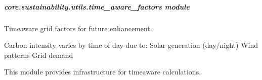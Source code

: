 \documentclass[letterpaper,10pt,english]{sphinxmanual}
\begin{document}
\sphinxstepscope


\subparagraph{core.sustainability.utils.time\_aware\_factors module}
\label{\detokenize{core.sustainability.utils.time_aware_factors:module-core.sustainability.utils.time_aware_factors}}\label{\detokenize{core.sustainability.utils.time_aware_factors:core-sustainability-utils-time-aware-factors-module}}\label{\detokenize{core.sustainability.utils.time_aware_factors::doc}}
\sphinxAtStartPar
Time\sphinxhyphen{}aware grid factors for future enhancement.

\sphinxAtStartPar
Carbon intensity varies by time of day due to:
\sphinxhyphen{} Solar generation (day/night)
\sphinxhyphen{} Wind patterns
\sphinxhyphen{} Grid demand

\sphinxAtStartPar
This module provides infrastructure for time\sphinxhyphen{}aware calculations.
\end{document}
